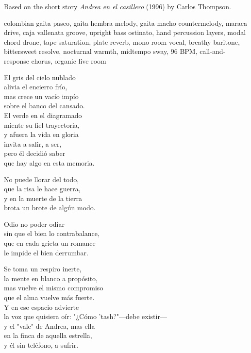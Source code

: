 
\begin{notes}
Based on the short story \emph{Andrea en el casillero} (1996) by Carlos Thompson.
\end{notes}
\begin{style}
colombian gaita paseo, gaita hembra melody, gaita macho countermelody, maraca drive, caja vallenata groove, upright bass ostinato, hand percussion layers, modal chord drone, tape saturation, plate reverb, mono room vocal, breathy baritone, bittersweet resolve, nocturnal warmth, midtempo sway, 96 BPM, call-and-response chorus, organic live room
\end{style}
\begin{lyrics}
El gris del cielo nublado\\
alivia el encierro frío,\\
mas crece un vacío impío\\
sobre el banco del cansado.\\
El verde en el diagramado\\
miente su fiel trayectoria,\\
y afuera la vida en gloria\\
invita a salir, a ser,\\
pero él decidió saber\\
que hay algo en esta memoria.

No puede llorar del todo,\\
que la risa le hace guerra,\\
y en la muerte de la tierra\\
brota un brote de algún modo.

Odio no poder odiar\\
sin que el bien lo contrabalance,\\
que en cada grieta un romance\\
le impide el bien derrumbar.

Se toma un respiro inerte,\\
la mente en blanco a propósito,\\
mas vuelve el mismo compromiso\\
que el alma vuelve más fuerte.\\
Y en ese espacio advierte\\
la voz que quisiera oír:
"¿Cómo 'tash?"—debe existir—\\
y el "vale" de Andrea, mas ella\\
en la finca de aquella estrella,\\
y él sin teléfono, a sufrir.


\end{lyrics}
